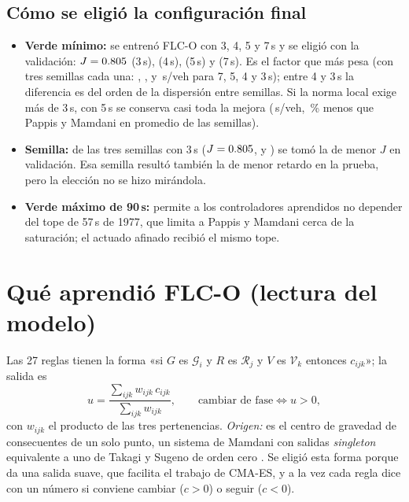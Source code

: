 \documentclass[11pt,a4paper]{article}
\newcommand{\FLC}{FLC-O}
\begin{document}
\subsection{Cómo se eligió la configuración final}
\begin{itemize}
\item \textbf{Verde mínimo:} se entrenó \FLC{} con 3, 4, 5 y 7\,s y se eligió con la validación: $J=0.805$ (3\,s), \JValGCuatro{} (4\,s), \JValGCinco{} (5\,s) y \JValGSiete{} (7\,s). Es el factor que más pesa (con tres semillas cada una: \MedOfGSiete{}, \MedOfGCinco{}, \MedOfGCuatro{} y \MedOfGTres{}\,s/veh para 7, 5, 4 y 3\,s); entre 4 y 3\,s la diferencia es del orden de la dispersión entre semillas. Si la norma local exige más de 3\,s, con 5\,s se conserva casi toda la mejora (\MedOfGCinco{}\,s/veh, \RedPapMedGCinco\,\% menos que Pappis y Mamdani en promedio de las semillas).
\item \textbf{Semilla:} de las tres semillas con 3\,s ($J=0.805$, \JValFlcUno{} y \JValFlc{}) se tomó la de menor $J$ en validación. Esa semilla resultó también la de menor retardo en la prueba, pero la elección no se hizo mirándola.
\item \textbf{Verde máximo de 90\,s:} permite a los controladores aprendidos no depender del tope de 57\,s de 1977, que limita a Pappis y Mamdani cerca de la saturación; el actuado afinado recibió el mismo tope.
\end{itemize}

\section{Qué aprendió FLC-O (lectura del modelo)}
\label{sec:lectura}

Las 27 reglas tienen la forma «si $G$ es $\mathcal{G}_i$ y $R$ es $\mathcal{R}_j$ y $V$ es $\mathcal{V}_k$ entonces $c_{ijk}$»; la salida es
\begin{equation}
u=\frac{\sum_{ijk}w_{ijk}\,c_{ijk}}{\sum_{ijk}w_{ijk}},\qquad \text{cambiar de fase}\iff u>0,
\label{eq:salida}
\end{equation}
con $w_{ijk}$ el producto de las tres pertenencias. \emph{Origen:} es el centro de gravedad de consecuentes de un solo punto, un sistema de Mamdani con salidas \emph{singleton} equivalente a uno de Takagi y Sugeno de orden cero \cite{TakagiSugeno1985}. Se eligió esta forma porque da una salida suave, que facilita el trabajo de CMA-ES, y a la vez cada regla dice con un número si conviene cambiar ($c>0$) o seguir ($c<0$).
\end{document}
